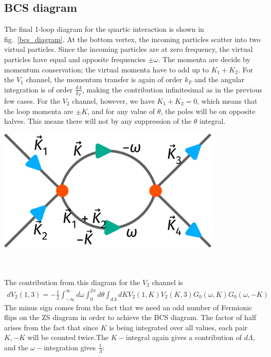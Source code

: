 \documentclass[12pt]{article}
\begin{document}
\subsection{BCS diagram}
\begin{minipage}{0.55\textwidth}
The final 1-loop diagram for the quartic interaction is shown in fig.~\ref{bcs_diagram}. At the bottom vertex, the incoming particles scatter into two virtual particles. Since the incoming particles are at zero frequency, the virtual particles have equal and opposite frequencies \(\pm \omega\). The momenta are decide by momentum conservation; the virtual momenta have to add up to \(K_1 + K_2\). For the \(V_1\) channel, the momentum transfer is again of order \(k_F\) and the angular integration is of order \(\frac{d\Lambda}{k_F}\), making the contribution infinitesimal as in the previous few cases. For the \(V_2\) channel, however, we have \(K_1 + K_2 = 0\), which means that the loop momenta are \(\pm K\), and for any value of \(\theta\), the poles will be on opposite halves. This means there will not by any suppression of the \(\theta\) integral.
\end{minipage}
\hspace*{\fill}
\begin{minipage}{0.4\textwidth}
	\centering
	\includegraphics[width=0.8\textwidth]{./figures/term6.pdf}
	\label{bcs_diagram}
\end{minipage}
\\\\
The contribution from this diagram for the \(V_2\) channel is
\begin{equation}\begin{aligned}
	dV_2(1,3) = -\frac{1}{2}\int_{-\infty}^\infty d\omega  \int_0^{2\pi} d\theta \int_{d\Lambda}dK V_2(1,K) V_2(K, 3) G_0(\omega, K)G_0(\omega, -K)
\end{aligned}\end{equation}
The minus sign comes from the fact that we need an odd number of Fermionic flips on the ZS diagram in order to achieve the BCS diagram. The factor of half arises from the fact that since \(K\) is being integrated over all values, each pair \(K, -K\) will be counted twice.The \(K-\)integral again gives a contribution of \(d\Lambda\), and the \(\omega-\)integration gives \(\frac{1}{\Lambda}\):
\end{document}

